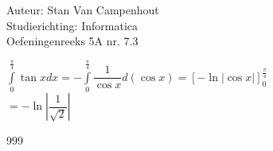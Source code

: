 \documentclass[a4paper]{article}
\begin{document}
  
\noindent \large Auteur: Stan Van Campenhout \\
\noindent \large Studierichting:  Informatica\\
\noindent \large Oefeningenreeks 5A nr. 7.3\\

\medskip

\normalsize

$ \displaystyle\int\limits_0^{\tfrac{\pi}{4}}\tan xdx = -\displaystyle\int\limits_0^{\tfrac{\pi}{4}}\dfrac{1}{\cos x}d\left(\cos x\right) = \left[-\ln|\cos x|\right]_0^{\tfrac{\pi}{4}} $\\

$ = -\ln\left|\dfrac{1}{\sqrt{2}}\right| $\\

\begin{thebibliography}{999}
\end{thebibliography}
\end{document}
